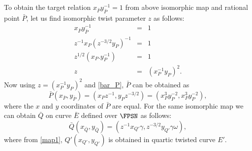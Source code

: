 To obtain the target relation $x_{\bar P}y_{\bar P}^{-1} = 1$ from  above isomorphic map and rational point $\bar P$, let us find isomorphic twist parameter $z$ as follows:
\begin{eqnarray}
x_{\bar P}y_{\bar P}^{-1}& =& 1 \nonumber \\
z^{-1}x_P (z^{-3/2}y_P)^{-1} &=& 1 \nonumber \\
z^{1/2}(x_P.y_P^{-1})&=&1\nonumber \\
z &= &(x_P^{-1}y_P)^2.
\end{eqnarray}
Now using $z = (x_P^{-1}y_P)^2$ and \eqref{bar_P}, $\bar P$ can be obtained as
\begin{equation}
\bar{P}(x_{\bar{P}}, y_{\bar{P}})= (x_P z^{-1},y_P z^{-3/2})=(x_P^3y_P^{-2},x_P^3y_P^{-2}),
\end{equation}
where the $x$ and $y$ coordinates of $\bar{P}$ are equal. For the same isomorphic map we can obtain $\bar{Q}$ on curve $\bar{E}$ defined over $\FPSN$ as follows:
\begin{equation} \label{Q_bar}
\bar{Q}(x_{\bar{Q}}, y_{\bar{Q}}) = (z^{-1}x_{Q'}\gamma, z^{-3/2}y_{Q'}\gamma \omega),
\end{equation} 
where from \eqref{map1}, $Q'(x_{Q'},y_{Q'})$ is obtained in quartic twisted curve $E'$. 

